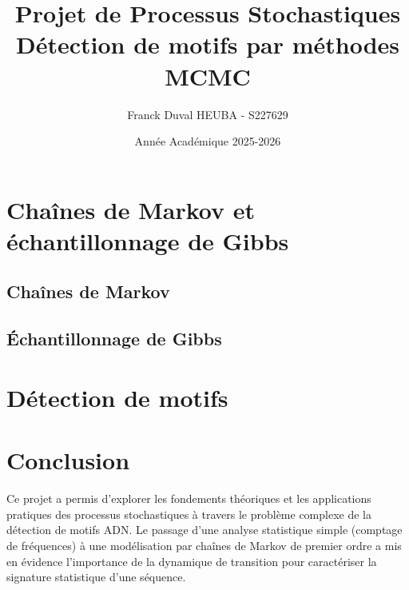\documentclass[12pt, a4paper]{article}
\title{Projet de Processus Stochastiques \\ \Large Détection de motifs par méthodes MCMC}
\author{Franck Duval HEUBA - S227629}
\date{Année Académique 2025-2026}
\begin{document}
\maketitle

\tableofcontents
\newpage

\section{Chaînes de Markov et échantillonnage de Gibbs}

\subsection{Chaînes de Markov}












\newpage
\subsection{Échantillonnage de Gibbs}





\newpage
\section{Détection de motifs}









\newpage
\section{Conclusion}

Ce projet a permis d'explorer les fondements théoriques et les applications pratiques 
des processus stochastiques à travers le problème complexe de la détection de motifs ADN. 
Le passage d'une analyse statistique simple (comptage de fréquences) à une modélisation 
par chaînes de Markov de premier ordre a mis en évidence l'importance de la dynamique de 
transition pour caractériser la signature statistique d'une séquence.
\end{document}
